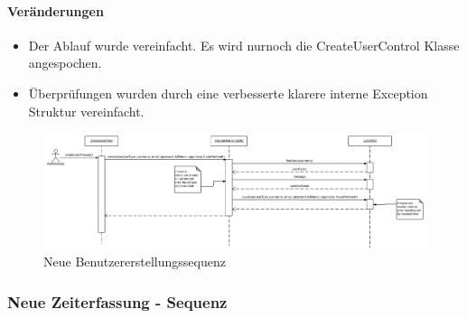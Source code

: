     \paragraph{Veränderungen}
        \begin{itemize}
            \item Der Ablauf wurde vereinfacht. Es wird nurnoch die CreateUserControl Klasse angespochen.
            \item Überprüfungen wurden durch eine verbesserte klarere interne Exception Struktur vereinfacht.
        \end{itemize}

    \begin{figure}[H]
      \centering
        \includegraphics[scale=0.1]{Create-user-account-new.pdf}
       \caption{Neue Benutzererstellungssequenz}
    \end{figure}

    \newpage
\subsubsection{Neue Zeiterfassung - Sequenz}

